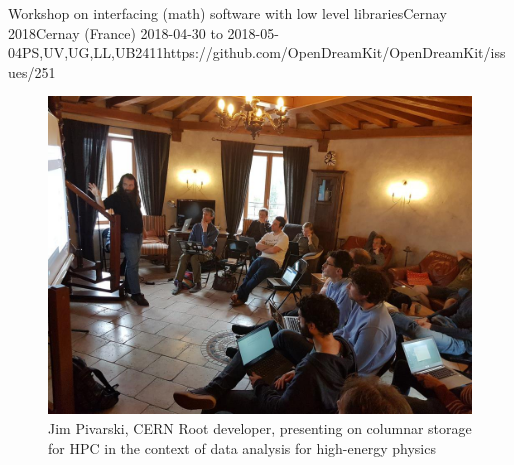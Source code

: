 \begin{event}{Workshop on interfacing (math) software with low level libraries}{Cernay 2018}{Cernay (France) 2018-04-30 to 2018-05-04}{PS,UV,UG,LL,UB}{24}{11}{https://github.com/OpenDreamKit/OpenDreamKit/issues/251}
  \begin{figure}[ht]
    \includegraphics{2018-04-30-Cernay.jpg}
    \caption*{Jim Pivarski, CERN Root developer, presenting on columnar
      storage for HPC in the context of data analysis for high-energy
      physics}
  \end{figure}

\end{event}
